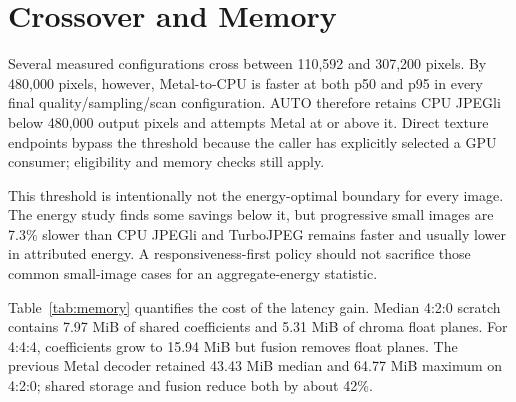\documentclass[10pt,twocolumn]{article}
\begin{document}
\section{Crossover and Memory}
\label{sec:crossover}

Several measured configurations cross between 110,592 and 307,200 pixels.
By 480,000 pixels, however, Metal-to-CPU is faster at both p50 and p95 in every
final quality/sampling/scan configuration.  AUTO therefore retains CPU JPEGli
below 480,000 output pixels and attempts Metal at or above it.  Direct texture
endpoints bypass the threshold because the caller has explicitly selected a
GPU consumer; eligibility and memory checks still apply.

This threshold is intentionally not the energy-optimal boundary for every
image.  The energy study finds some savings below it, but progressive small
images are 7.3\% slower than CPU JPEGli and TurboJPEG remains faster and
usually lower in attributed energy.  A responsiveness-first policy should not
sacrifice those common small-image cases for an aggregate-energy statistic.

\begin{table}[t]
  \centering
  \caption{Retained decoder memory on CLIC (median / maximum MiB).}
  \label{tab:memory}
  \scriptsize
\end{table}

Table~\ref{tab:memory} quantifies the cost of the latency gain.  Median 4:2:0
scratch contains 7.97 MiB of shared coefficients and 5.31 MiB of chroma float
planes.  For 4:4:4, coefficients grow to 15.94 MiB but fusion removes float
planes.  The previous Metal decoder retained 43.43 MiB median and 64.77 MiB
maximum on 4:2:0; shared storage and fusion reduce both by about 42\%.
\end{document}
